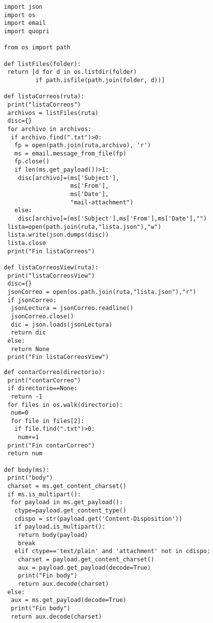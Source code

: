 \begin{lstlisting}[frame=single]
import json
import os
import email
import quopri

from os import path

def listFiles(folder):
 return [d for d in os.listdir(folder) 
         if path.isfile(path.join(folder, d))]

def listaCorreos(ruta):
 print("listaCorreos")
 archivos = listFiles(ruta)
 disc={}
 for archivo in archivos:
  if archivo.find(".txt")>0:
   fp = open(path.join(ruta,archivo), 'r')
   ms = email.message_from_file(fp)
   fp.close()
   if len(ms.get_payload())>1:
    disc[archivo]=(ms['Subject'],
                   ms['From'],
                   ms['Date'],
                   "mail-attachment")
   else:
    disc[archivo]=(ms['Subject'],ms['From'],ms['Date'],"")
 lista=open(path.join(ruta,"lista.json"),"w") 
 lista.write(json.dumps(disc))
 lista.close
 print("Fin listaCorreos")

def listaCorreosView(ruta):
 print("listaCorreosView")
 disc={}
 jsonCorreo = open(os.path.join(ruta,"lista.json"),"r")
 if jsonCorreo:
  jsonLectura = jsonCorreo.readline()
  jsonCorreo.close()
  dic = json.loads(jsonLectura)
  return dic
 else:
  return None
 print("Fin listaCorreosView")
\end{lstlisting}
\begin{lstlisting}[frame=single]
def contarCorreo(directorio):
 print("contarCorreo")
 if directorio==None:
  return -1
 for files in os.walk(directorio):
  num=0
  for file in files[2]:
   if file.find(".txt")>0:
    num+=1
 print("Fin contarCorreo")
 return num

def body(ms):
 print("body")
 charset = ms.get_content_charset()
 if ms.is_multipart():
  for payload in ms.get_payload():
   ctype=payload.get_content_type()
   cdispo = str(payload.get('Content-Disposition'))
   if payload.is_multipart():
    return body(payload)
    break
   elif ctype=='text/plain' and 'attachment' not in cdispo:
    charset = payload.get_content_charset()
    aux = payload.get_payload(decode=True)
    print("Fin body")
    return aux.decode(charset)
 else:
  aux = ms.get_payload(decode=True)
  print("Fin body")
  return aux.decode(charset)
\end{lstlisting}
